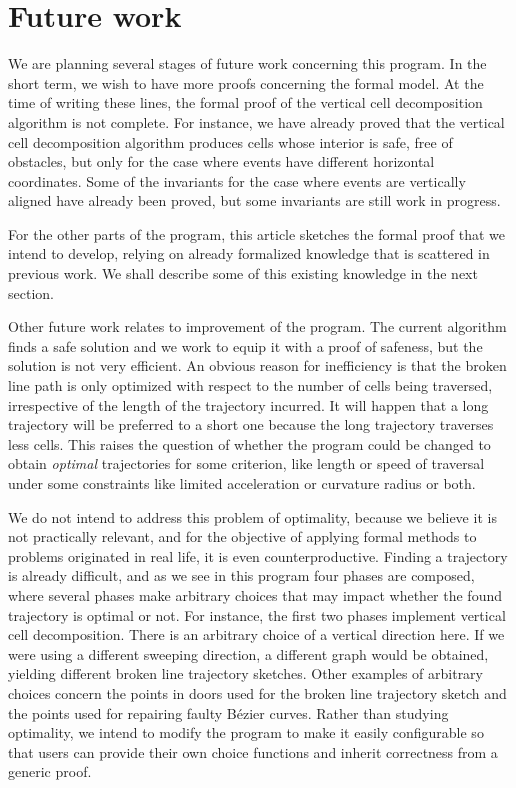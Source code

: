 \documentclass{llncs}
\begin{document}
\section{Future work}
We are planning several stages of future work concerning this program.  In
the short term, we wish to have more proofs concerning the formal model.
At the time of writing these lines, the formal proof of the vertical cell
decomposition algorithm is not complete.  For instance, we have already
proved that the vertical cell decomposition algorithm produces cells whose
interior is safe, free of obstacles, but only for the case where events
have different horizontal coordinates.  Some of the invariants for the
case where events are vertically aligned have already been proved, but some
invariants are still work in progress.

For the other parts of the program, this article sketches the formal
proof that we intend to develop, relying on already formalized
knowledge that is scattered in previous work.  We shall describe some
of this existing knowledge in the next section.

Other future work relates to improvement of the program.  The current
algorithm finds a safe solution and we work to equip it with a proof
of safeness, but the solution is not very efficient.  An obvious
reason for inefficiency is that the broken line path is only optimized
with respect to the number of cells being traversed, irrespective of
the length of the trajectory incurred.  It will happen that a long
trajectory will be preferred to a short one because the long
trajectory traverses less cells.   This raises the question of whether
the program could be changed to obtain {\em optimal} trajectories for
some criterion, like length or speed of traversal under some
constraints like limited acceleration or curvature radius or both.

We do not intend to address this problem of optimality, because we
believe it is not practically relevant, and for the objective of
applying formal methods to problems originated in real life, it is
even counterproductive.  Finding a trajectory is already difficult,
and as we see in this program four phases are composed, where several
phases make arbitrary choices that may impact whether the found
trajectory is optimal or not.  For
instance, the first two phases implement vertical cell decomposition.
There is an arbitrary choice of a vertical direction here.  If we were
using a different sweeping direction, a different graph would be
obtained, yielding different broken line trajectory sketches.
Other examples of arbitrary choices concern the points in doors used
for the broken line trajectory sketch and the points used for repairing
faulty Bézier curves.  Rather than studying optimality, we intend to
modify the program to make it easily configurable so that users can
provide their own choice functions and inherit correctness from a
generic proof.
\end{document}
